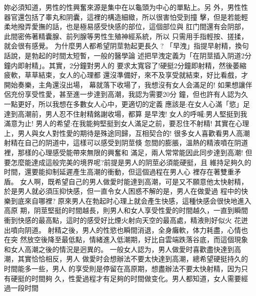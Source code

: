 \documentclass[12pt,UTF8]{ctexbook}
\begin{document}
妳必須知道，男性的性興奮來源是集中在以龜頭为中心的單點上。另
外，男性性器官還包括了睾丸和阴囊，這裡的構造細緻，所以很害怕受到撞
擊，但是若能輕柔地撥弄愛撫的話，也是極易感受快感的部位，這個部位與
肛门間還有会阴部，此間密佈著精囊腺、前列腺等男性生殖神經系統，所以
只需用手指輕按、搓揉，就会很有感覺。
为什麼男人都希望阴莖勃起更長久 ?
「早洩」指提早射精，換句話說，是勃起的时間太短暫，一般的醫學論
述把早洩定義为「在阴莖插入阴道2分鐘内即射精」。其實，2分鐘對男人的
要求太寬容了!硬挺2分鐘即射精，然後萎縮疲軟，草草結束，女人的心理都
還沒準備好，來不及享受就結束，好比看戲，才開始奏樂，主角還沒出場，
幕就落下收場了，我想沒有女人会滿足的!
如果想讓伴侶充份享受性愛，甚至進一步達到高潮，我認为需要20分
鐘，但也許有人認为久一點更好，所以我想在多數女人心中，更適切的定義
應該是:在女人心滿「慾」足達到高潮前，男人忍不住射精銘謝收場，都算
是早洩!
女人的呼喊:男人堅挺到我滿意为止!
男人的希望:在我能夠堅挺到女人滿足之前，要忍住不射精!
其實在心理上，男人與女人對性愛的期待是殊途同歸，互相契合的!
很多女人喜歡看男人高潮射精在自己的阴道中，這樣可以感受到阴莖倏
忽間的膨脹，溫熱的精液噴在阴道裡，那樣的心理感受能帶來無限的興奮和
滿足，兩人常常能因此同步達到高潮!
但要怎麼能達成這般完美的境界呢?前提是男人的阴莖必須能硬挺，且
維持足夠久的时間，還要能抑制延遲產生高潮的衝動，但這個過程在男人心
裡存在著雙重矛盾。
女人啊，既希望自己的男人做愛时能達到高潮，可是又不願意他太快射精，於是男人就必須压抑快感，但一直令女人困惑不解的是，男人在做愛過
程中的快樂到底來自哪裡?
原來男人在勃起时心理上就会產生快感，這種快感会很快地進入高原
期，阴莖堅挺的时間越長，則男人和女人享受性愛的时間越久，一直到瞬間
衝到快感的最高點，這时的感受好比煙火射向天空的最高處，精液則好似火
花迸出噴向阴道。
射精之後，男人的性慾也瞬間消退，全身癱軟，体力耗盡，心情也在突
然放空後降至最低點，情緒進入低潮期，好比自雲端跌落谷底，而這個現象
和女人高潮之後的情況是迥異的。
一般女人認为，男人做愛时喜歡盡快達到高潮，其實恰恰相反，男人
做愛时会想辦法不要太快達到高潮，總希望硬挺持久的时間能多一些，男人
的享受則是停留在高原期，想盡辦法不要太快射精，因为只有硬挺的时間夠
久，性愛過程才有足夠的时間做变化。男人都知道，女人需要經過一段时間
\end{document}
